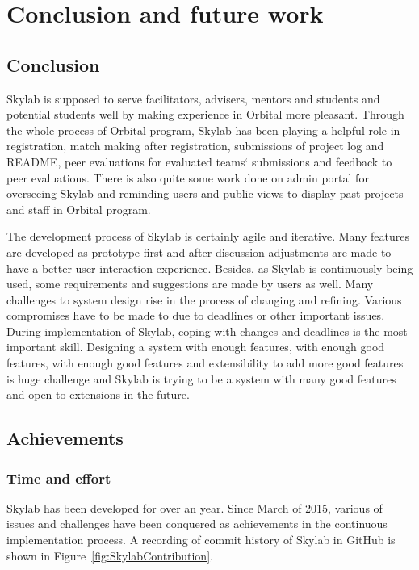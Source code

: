 \chapter{Conclusion and future work} \label{conclusionandfuturework}

\section{Conclusion}

Skylab is supposed to serve facilitators, advisers, mentors and students and potential students well by making experience in Orbital more pleasant. Through the whole process of Orbital program, Skylab has been playing a helpful role in registration, match making after registration, submissions of project log and README, peer evaluations for evaluated teams` submissions and feedback to peer evaluations. There is also quite some work done on admin portal for overseeing Skylab and reminding users and public views to display past projects and staff in Orbital program.

The development process of Skylab is certainly agile and iterative. Many features are developed as prototype first and after discussion adjustments are made to have a better user interaction experience. Besides, as Skylab is continuously being used, some requirements and suggestions are made by users as well. Many challenges to system design rise in the process of changing and refining. Various compromises have to be made to due to deadlines or other important issues. During implementation of Skylab, coping with changes and deadlines is the most important skill. Designing a system with enough features, with enough good features, with enough good features and extensibility to add more good features is huge challenge and Skylab is trying to be a system with many good features and open to extensions in the future.

\section{Achievements}

\subsection{Time and effort}

Skylab has been developed for over an year. Since March of 2015, various of issues and challenges have been conquered as achievements in the continuous implementation process. A recording of commit history of Skylab in GitHub is shown in Figure~\ref{fig:SkylabContribution}.

